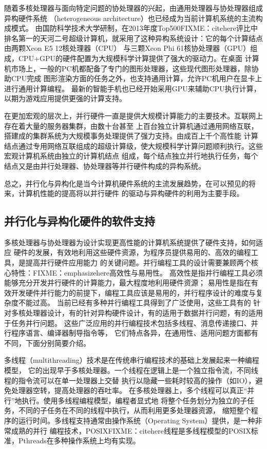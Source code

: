 随着多核处理器与面向特定问题的协处理器的兴起，由通用处理器与协处理器组成异构硬件系统
（heterogeneous architecture）也已经成为当前计算机系统的主流构成模式。
由国防科学技术大学研制，在2013年度Top500FIXME：citehere评比中
排名第一的天河二号超级计算机，就采用了这种异构系统设计：它的每个计算结点由两颗Xeon E5 12核处理器（CPU）
与三颗Xeon Phi 61核协处理器（GPU）组成，CPU+GPU的硬件配置为大规模科学计算提供了强大的驱动力。在桌面
计算机市场上，一般的PC机都配备了专门的图形处理器，这些现代图形处理器，除协助CPU完成
图形渲染方面的任务之外，也支持通用计算，允许PC机用户在显卡上进行通用计算编程。
最新的智能手机也已经开始采用GPU来辅助CPU执行计算，以期为游戏应用提供更强的计算支持。

在更加宏观的层次上，并行硬件一直是提供大规模计算能力的主要技术。互联网上存在着大量的服务器集群，由数十台甚至
上百台独立计算机通过通用网络互联，搭建成的集群系统为大规模事务处理提供了强力支持。由成百上千个高性能
计算结点通过专用网络互联组成的超级计算级，使大规模科学计算问题顺利执行。这些宏观计算机系统由独立的计算机结点
组成，每个结点独立并行地执行任务，每个结点又是由并行处理器、协处理器等并行硬件构成的异构系统。

总之，并行化与异构化是当今计算机硬件系统的主流发展趋势，在可以预见的将来，计算机性能的提高将以并行硬件
的驱动与异构硬件的利用为主要手段。

\subsection{并行化与异构化硬件的软件支持}
多核处理器与协处理器为设计实现更高性能的计算机系统提供了硬件支持，如何适应
硬件的发展，有效地利用这些硬件资源，为程序员提供易用的、高效的编程工具，是提高并行硬件应用能力
的关键问题。并行编程工具的设计需要兼顾两个核心特性：FIXME：emphasizehere高效性与易用性。
高效性是指并行编程工具必须能够充分开发并行硬件的计算能力，最大程度地利用硬件资源；
易用性是指在有效开发硬件并行能力的前提下，编程工具应该是易用的，并行程序设计的难度与复杂度不能过高。
当前已经有多种并行编程工具得到了广泛使用，这些工具有的
针对多核处理器设计，有的针对异构硬件设计，有的适用于数据并行问题，有的适用于任务并行问题。
这些广泛应用的并行编程技术包括多线程、消息传递接口、并行程序语言、编译器制导指令等，
它们特点各异，在通用性、适用问题方面都有不同，下面分别简要介绍。

多线程（multithreading）技术是在传统串行编程技术的基础上发展起来一种编程模型，
它的出现早于多核处理器。一个线程在逻辑上是一个独立指令流，不同线程的指令流可以在单一处理器上交替
执行以隐藏一些耗时较高的操作（如IO），避免处理器空转，提高处理器的吞吐率。
在多核处理器上，多个线程可以真正“并行”地执行。使用多线程编程模型，编程者显式地
将整个任务划分为独立的子任务，不同的子任务在不同的线程中执行，从而利用更多处理器资源，
缩短整个程序的运行时间。多线程支持通常由操作系统（Operating System）提供，是一种非常成熟的并行
编程技术，POSIXFIXME：citehere线程是多线程模型的POSIX标准，Pthreads在多种操作系统上均有实现。

